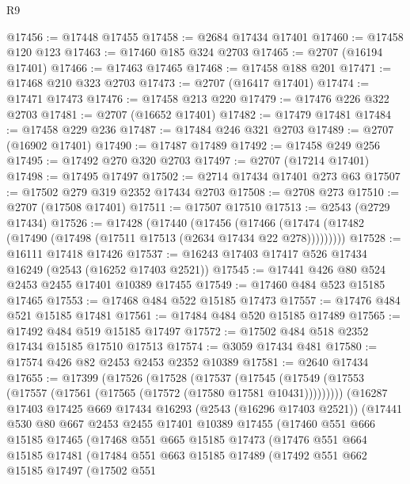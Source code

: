 \begin{lexlean}{R9}
\begin{coremodule}
@17456 := @17448 @17455
@17458 := @2684 @17434 @17401
@17460 := @17458 @120 @123
@17463 := @17460 @185 @324 @2703
@17465 := @2707 (@16194 @17401)
@17466 := @17463 @17465
@17468 := @17458 @188 @201
@17471 := @17468 @210 @323 @2703
@17473 := @2707 (@16417 @17401)
@17474 := @17471 @17473
@17476 := @17458 @213 @220
@17479 := @17476 @226 @322 @2703
@17481 := @2707 (@16652 @17401)
@17482 := @17479 @17481
@17484 := @17458 @229 @236
@17487 := @17484 @246 @321 @2703
@17489 := @2707 (@16902 @17401)
@17490 := @17487 @17489
@17492 := @17458 @249 @256
@17495 := @17492 @270 @320 @2703
@17497 := @2707 (@17214 @17401)
@17498 := @17495 @17497
@17502 := @2714 @17434 @17401 @273 @63
@17507 := @17502 @279 @319 @2352 @17434 @2703
@17508 := @2708 @273
@17510 := @2707 (@17508 @17401)
@17511 := @17507 @17510
@17513 := @2543 (@2729 @17434)
@17526 := @17428
    (@17440
      (@17456 (@17466 (@17474 (@17482 (@17490 (@17498 (@17511 @17513 (@2634 @17434 @22 @278)))))))))
@17528 := @16111 @17418 @17426
@17537 := @16243 @17403 @17417 @526 @17434 @16249 (@2543 (@16252 @17403 @2521))
@17545 := @17441 @426 @80 @524 @2453 @2455 @17401 @10389 @17455
@17549 := @17460 @484 @523 @15185 @17465
@17553 := @17468 @484 @522 @15185 @17473
@17557 := @17476 @484 @521 @15185 @17481
@17561 := @17484 @484 @520 @15185 @17489
@17565 := @17492 @484 @519 @15185 @17497
@17572 := @17502 @484 @518 @2352 @17434 @15185 @17510 @17513
@17574 := @3059 @17434 @481
@17580 := @17574 @426 @82 @2453 @2453 @2352 @10389
@17581 := @2640 @17434
@17655 := @17399
    (@17526
      (@17528
        (@17537
          (@17545 (@17549 (@17553 (@17557 (@17561 (@17565 (@17572 (@17580 @17581 @10431)))))))))
        (@16287
          @17403
          @17425
          @669
          @17434
          @16293
          (@2543 (@16296 @17403 @2521))
          (@17441
            @530
            @80
            @667
            @2453
            @2455
            @17401
            @10389
            @17455
            (@17460
              @551
              @666
              @15185
              @17465
              (@17468
                @551
                @665
                @15185
                @17473
                (@17476
                  @551
                  @664
                  @15185
                  @17481
                  (@17484
                    @551
                    @663
                    @15185
                    @17489
                    (@17492
                      @551
                      @662
                      @15185
                      @17497
                      (@17502
                        @551

\end{coremodule}
\end{lexlean}
